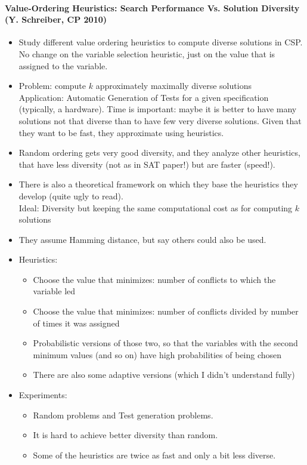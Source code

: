 \newpage
\paragraph{Value-Ordering Heuristics: Search Performance Vs. Solution Diversity (Y. Schreiber, CP 2010)}

\begin{itemize}
\item
    Study different value ordering heuristics to compute diverse solutions in CSP.
    No change on the variable selection heuristic, just on the value that is assigned to the variable.
\item
    Problem: compute $k$ approximately maximally diverse solutions
    \\
    Application: Automatic Generation of Tests for a given specification (typically, a hardware).
    Time is important: maybe it is better to have many solutions not that diverse 
    than to have few very diverse solutions.
    Given that they want to be fast, they approximate using heuristics.
\item
    Random ordering gets very good diversity, 
    and they analyze other heuristics, that have less diversity (not as in SAT paper!)
    but are faster (speed!).
\item
    There is also a theoretical framework on which they base the heuristics they develop
    (quite ugly to read).
    \\
    Ideal: Diversity but keeping the same computational cost as for computing $k$ solutions
\item
    They assume Hamming distance, but say others could also be used.
\item
    Heuristics:
    \begin{itemize}
    \item
        Choose the value that minimizes: number of conflicts to which the variable led
    \item
        Choose the value that minimizes: number of conflicts divided by number of times it was assigned
    \item
        Probabilistic versions of those two, 
        so that the variables with the second minimum values (and so on)
        have high probabilities of being chosen
    \item There are also some adaptive versions (which I didn't understand fully)
    \end{itemize}
\item
    Experiments:
    \begin{itemize}
    \item
        Random problems and Test generation problems.
    \item
        It is hard to achieve better diversity than random.
    \item
        Some of the heuristics are twice as fast and only a bit less diverse.
    \end{itemize}

\end{itemize}

